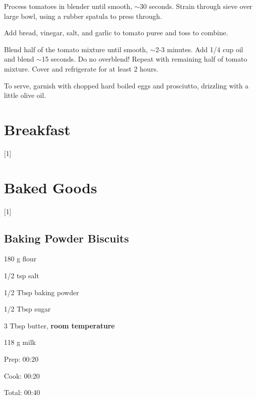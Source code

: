 \documentclass[oneside]{book}  %
\def\thisrecipe{}  %
\newcommand{\chapterrec}[1]{  %
  \newpage \def\thisrecipe{} \chapter{#1} \vspace{1.1em}
}
\newcommand{\chaptertoc}[1]{  %
  \chapterrec{#1} \vspace{-1.1em}  %
  \startcontents[chapters] \printcontents[chapters]{chapter_toc_}{1}[1]{}
}
\newcommand{\recipe}[1]{\section{#1}\def\thisrecipe{: #1}} %
\newcommand{\about}{$\sim$}
\begin{document}
\begin{directions}
  \item Process tomatoes in blender until smooth, \about 30 seconds. Strain
  through sieve over large bowl, using a rubber spatula to press through.

  \item Add bread, vinegar, salt, and garlic to tomato puree and toss to
  combine.

  \item Blend half of the tomato mixture until smooth, \about 2-3 minutes. Add
  1/4 cup oil and blend \about 15 seconds. Do no overblend! Repeat with
  remaining half of tomato mixture. Cover and refrigerate for at least 2 hours.

  \item To serve, garnish with chopped hard boiled eggs and prosciutto,
  drizzling with a little olive oil.
\end{directions}

\chaptertoc{Breakfast} \label{chap:breakfast}

\chaptertoc{Baked Goods} \label{chap:baked_goods}
\recipe{Baking Powder Biscuits} \label{recipe:baking_powder_biscuits} %

\begin{IT}
  \begin{ingredients}
    \item[180 g] flour
    \item[1/2 tsp] salt
    \item[1/2 Tbsp] baking powder
    \item[1/2 Tbsp] sugar
    \item[3 Tbsp] butter, \textbf{room temperature}
    \item[118 g] milk
  \end{ingredients}

  \switchcolumn

  \begin{timeline}
    \item[Prep:]  00:20
    \item[Cook:]  00:20
    \item[Total:] 00:40
  \end{timeline}
\end{IT}
\end{document}
